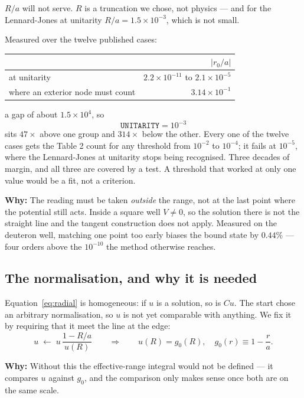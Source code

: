 \documentclass[11pt,a4paper]{article}
\newcommand{\why}[1]{\medskip\noindent\textbf{Why:} #1\medskip}
\begin{document}
$R/a$ will not serve. $R$ is a truncation we chose, not physics --- and for the
Lennard-Jones at unitarity $R/a = 1.5\times10^{-3}$, which is not small.

Measured over the twelve published cases:
\begin{center}
\begin{tabular}{lr}
\toprule
 & $|r_0/a|$ \\
\midrule
at unitarity & $2.2\times10^{-11}$ to $2.1\times10^{-5}$ \\
where an exterior node must count & $3.14\times10^{-1}$ \\
\bottomrule
\end{tabular}
\end{center}
a gap of about $1.5\times10^{4}$, so
\begin{equation}
  \texttt{UNITARITY} = 10^{-3}
\end{equation}
sits $47\times$ above one group and $314\times$ below the other. Every one of
the twelve cases gets the Table 2 count for any threshold from $10^{-2}$ to
$10^{-4}$; it fails at $10^{-5}$, where the Lennard-Jones at unitarity stops
being recognised. Three decades of margin, and all three are
covered by a test. A threshold that worked at only one value would be a fit,
not a criterion.

\why{The reading must be taken \emph{outside} the range, not at the last point
where the potential still acts. Inside a square well $V\neq0$, so the solution
there is not the straight line and the tangent construction does not apply.
Measured on the deuteron well, matching one point too early biases the bound
state by $0.44\%$ --- four orders above the $10^{-10}$ the method otherwise
reaches.}

\subsection{The normalisation, and why it is needed}
\label{sec:norm}

Equation~\eqref{eq:radial} is homogeneous: if $u$ is a solution, so is $Cu$. The
start chose an arbitrary normalisation, so $u$ is not yet comparable with
anything. We fix it by requiring that it meet the line at the edge:
\begin{equation}
  u \;\longleftarrow\; u\,\frac{1 - R/a}{u(R)}
  \qquad\Longrightarrow\qquad u(R) = g_0(R), \quad g_0(r) \equiv 1 - \frac{r}{a}.
\end{equation}

\why{Without this the effective-range integral would not be defined --- it
compares $u$ against $g_0$, and the comparison only makes sense once both are on
the same scale.}
\end{document}
